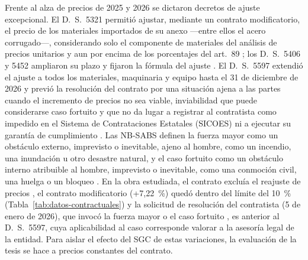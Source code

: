 Frente al alza de precios de 2025 y 2026 se dictaron decretos de ajuste excepcional. El D.~S.~5321 permitió ajustar, mediante un contrato modificatorio, el precio de los materiales importados de su anexo ---entre ellos el acero corrugado---, considerando solo el componente de materiales del análisis de precios unitarios y aun por encima de los porcentajes del art.~89 \parencite[arts.~3--4 y anexo]{ds5321_2025}; los D.~S.~5406 y 5452 ampliaron su plazo y fijaron la fórmula del ajuste \parencite{ds5406_2025,ds5452_2025}. El D.~S.~5597 extendió el ajuste a todos los materiales, maquinaria y equipo hasta el 31 de diciembre de 2026 y previó la resolución del contrato por una situación ajena a las partes cuando el incremento de precios no sea viable, inviabilidad que puede considerarse caso fortuito y que no da lugar a registrar al contratista como impedido en el Sistema de Contrataciones Estatales (SICOES) ni a ejecutar su garantía de cumplimiento \parencite[art.~4 y disposición adicional quinta]{ds5597_2026}. Las NB-SABS definen la fuerza mayor como un obstáculo externo, imprevisto o inevitable, ajeno al hombre, como un incendio, una inundación u otro desastre natural, y el caso fortuito como un obstáculo interno atribuible al hombre, imprevisto o inevitable, como una conmoción civil, una huelga o un bloqueo \parencite[art.~5, incs.~c y p, pp.~20, 22]{ds0181_2025compilado}. En la obra estudiada, el contrato excluía el reajuste de precios \parencite[p.~95]{uatf2025pao2}, el contrato modificatorio (+7,22~\%) quedó dentro del límite del 10~\% (Tabla~\ref{tab:datos-contractuales}) y la solicitud de resolución del contratista (5 de enero de 2026), que invocó la fuerza mayor o el caso fortuito \parencite[p.~14]{uatf_item13}, es anterior al D.~S.~5597, cuya aplicabilidad al caso corresponde valorar a la asesoría legal de la entidad. Para aislar el efecto del SGC de estas variaciones, la evaluación de la tesis se hace a precios constantes del contrato.

